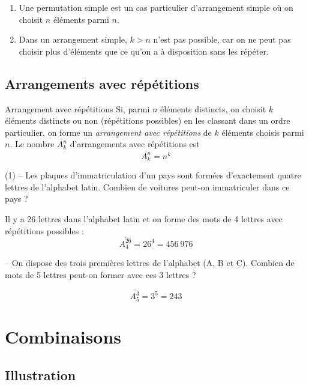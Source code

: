 \documentclass[a4paper,12pt]{article}
\begin{document}
\begin{remarque}
	\tcblower
	\begin{enumerate}
		\item Une permutation simple est un cas particulier d'arrangement simple où on choisit $n$ éléments parmi $n$.
		\item Dans un arrangement simple, $k > n$ n'est pas possible, car on ne peut pas choisir plus d'éléments que ce qu'on a à disposition sans les répéter.
	\end{enumerate}
\end{remarque}

\subsection{Arrangements avec répétitions}

\begin{definition}
	Arrangement avec répétitions
	\tcblower
	Si, parmi $n$ éléments distincts, on choisit $k$ éléments distincts ou non (répétitions possibles) en les classant dans un ordre particulier, on forme un \emph{arrangement avec répétitions} de $k$ éléments choisis parmi $n$. Le nombre $\overline{A_k^n}$ d'arrangements avec répétitions est
	\[\overline{A_k^n} = n^k\]
\end{definition}

\begin{exemple}
	\tcblower
	\begin{tasks}(1)
		 -- Les plaques d'immatriculation d'un pays sont formées d'exactement quatre lettres de l'alphabet latin. Combien de voitures peut-on immatriculer dans ce pays ?

		Il y a 26 lettres dans l'alphabet latin et on forme des mots de 4 lettres avec répétitions possibles :
		\[\overline{A_4^{26}} = 26^4 = 456~976\]

		 -- On dispose des trois premières lettres de l'alphabet (A, B et C). Combien de mots de 5 lettres peut-on former avec ces 3 lettres ?

		\[\overline{A_5^3} = 3^5 = 243\]
	\end{tasks}
\end{exemple}

\section{Combinaisons}

\subsection{Illustration}
\end{document}
